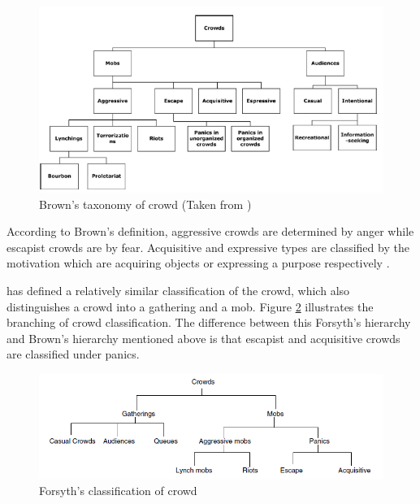 \begin{figure}[htb!] 
	\centering    
	\includegraphics[width=1.0\textwidth]{BrownCrowdType}
	\caption{Brown's taxonomy of crowd (Taken from \citet{Pelechano2008})}
	\label{fig:brownCrowdType}
\end{figure}


According to Brown’s definition, aggressive crowds are determined by anger while escapist crowds are by fear. Acquisitive and expressive types are classified by the motivation which are acquiring objects or expressing a purpose respectively \citep{Durupinar2010}.

\citet{Forsyth2009} has defined a relatively similar classification of the crowd, which also distinguishes a crowd into a gathering and a mob. Figure \ref{fig:forsythCrowdType} illustrates the branching of crowd classification. The difference between this Forsyth’s hierarchy and Brown’s hierarchy mentioned above is that escapist and acquisitive crowds are classified under panics. 

\begin{figure}[htb!] 
	\centering    
	\includegraphics[width=1.0\textwidth]{ForsythCrowdType}
	\caption{Forsyth's classification of crowd}
	\label{fig:forsythCrowdType}
\end{figure}

